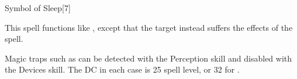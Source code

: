 \begin{spellsection}{Symbol of Sleep}[7]
    \begin{spellheader}
    \end{spellheader}
    \begin{spellcontent}
        \begin{spelltargetinginfo}
        \end{spelltargetinginfo}
        \begin{spelleffects}

            \spelleffect This spell functions like , except that the target instead suffers the effects of the  spell.
        \end{spelleffects}
    \end{spellcontent}
    \begin{spellfooter}
        \spellnotes Magic traps such as  can be detected with the Perception skill and disabled with the Devices skill. The DC in each case is 25 \add spell level, or 32 for .
    \end{spellfooter}
\end{spellsection}

